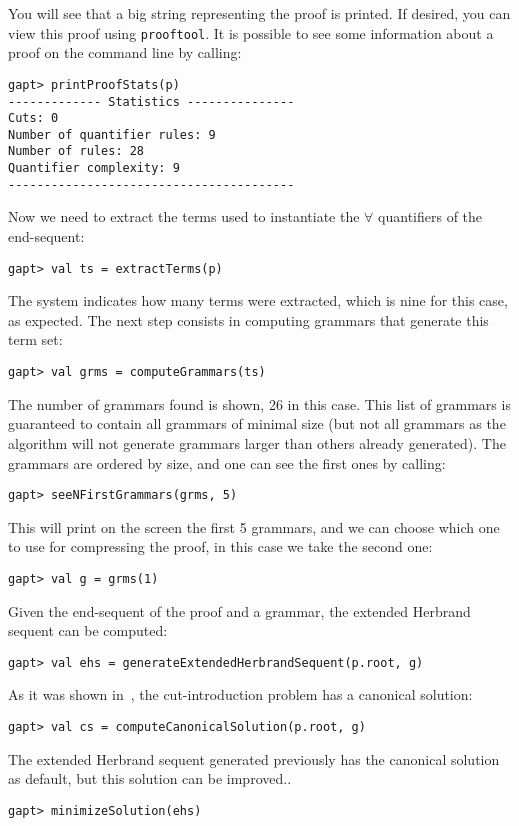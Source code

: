 \documentclass[a4paper,11pt]{article}
\begin{document}
You will see that a big string representing the proof is printed. If desired,
you can view this proof using \texttt{prooftool}. 
It is possible to see some information about a proof on the command line by calling:
\begin{lstlisting}
gapt> printProofStats(p)
------------- Statistics ---------------
Cuts: 0
Number of quantifier rules: 9
Number of rules: 28
Quantifier complexity: 9
----------------------------------------
\end{lstlisting}
Now we need to
extract the terms used to instantiate the $\forall$ quantifiers of the
end-sequent:
\begin{lstlisting}
gapt> val ts = extractTerms(p)
\end{lstlisting}
The system indicates how many terms were extracted, which is nine for this case,
as expected. The next step consists in computing grammars that generate this
term set:
\begin{lstlisting}
gapt> val grms = computeGrammars(ts)
\end{lstlisting}
The number of grammars found is shown, 26 in this case. This list of grammars is guaranteed
to contain all grammars of minimal size (but not all grammars as the algorithm
will not generate grammars larger than others already generated).
The grammars are ordered by size, and one can see the first ones by calling:
\begin{lstlisting}
gapt> seeNFirstGrammars(grms, 5)
\end{lstlisting}
This will print on the screen the first 5 grammars, and we can choose which one
to use for compressing the proof, in this case we take the second one:
\begin{lstlisting}
gapt> val g = grms(1)
\end{lstlisting}
Given the end-sequent of the proof and a grammar, the extended Herbrand sequent can be computed:
\begin{lstlisting}
gapt> val ehs = generateExtendedHerbrandSequent(p.root, g)
\end{lstlisting}
As it was shown in~\cite{Hetzl2012}, the cut-introduction problem has a
canonical solution:
\begin{lstlisting}
gapt> val cs = computeCanonicalSolution(p.root, g)
\end{lstlisting}
The extended Herbrand sequent generated previously has the canonical solution as
default, but this solution can be improved.. 
\begin{lstlisting}
gapt> minimizeSolution(ehs)
\end{lstlisting}
\end{document}
